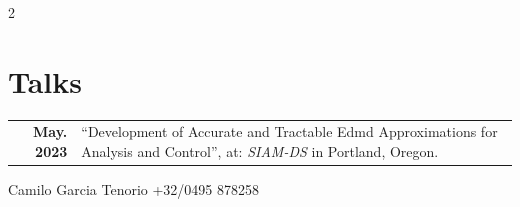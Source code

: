 \documentclass[10pt,a4paper,grey]{hipstercv}
\newlength{\rightcolwidth}
\begin{document}
\begin{paracol}{2}
\begin{minipage}[t]{0.37\textwidth}
		\section*{Talks}
		\begin{tabular}{>{\footnotesize\bfseries}r >{\footnotesize}p{}}
			May. 2023 & ``Development of Accurate and Tractable Edmd Approximations for Analysis and Control'', at: \emph{SIAM-DS} in Portland, Oregon.
		\end{tabular}
	\end{minipage}









	\vfill{} %

	\setlength{\parindent}{0pt}
	\begin{minipage}[t]{\rightcolwidth}
		\begin{center}\fontfamily{\sfdefault}\selectfont \color{black!70}
			{\small Camilo Garcia Tenorio\href{mailto:camilo_7@msn.com}{} \href{https://www.linkedin.com/in/camilo-garcia-tenorio-08813740/}{} \href{https://github.com/garten-cam}{} +32/0495 878258}
		\end{center}
	\end{minipage}


\end{paracol}
\end{document}
